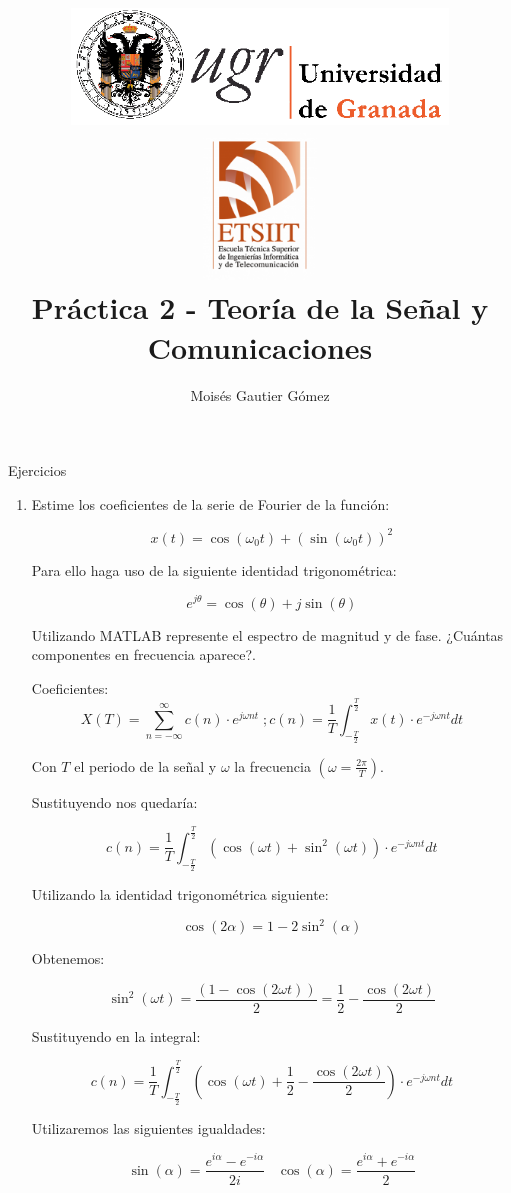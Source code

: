 \documentclass[a4paper,12pt]{article}
\author{Moisés Gautier Gómez}
\title{\includegraphics[width=10cm]{logo_ugr.png} \\ \includegraphics[width=3cm]{fetch.png}\\ Práctica 2 - Teoría de la Señal y Comunicaciones 
}
\date{ }
\begin{document}
\maketitle
Ejercicios
%

\begin{enumerate}
\item Estime los coeficientes de la serie de Fourier de la función:

  $$x(t) = \cos(\omega_{0}t) + (\sin(\omega_{0}t))^2$$

  Para ello haga uso de la siguiente identidad trigonométrica:

  $$e^{j\theta} = \cos(\theta) + j \sin(\theta)$$

  Utilizando MATLAB represente el espectro de magnitud y de fase. ¿Cuántas componentes en frecuencia aparece?.

  Coeficientes:
  $$X(T) = \sum_{n = -\infty}^{\infty} c(n) \cdot e^{j \omega n t}\; ; c(n) = \frac{1}{T} \int_{-\frac{T}{2}}^{\frac{T}{2}} x(t) \cdot e^{-j \omega n t} dt $$

  Con $T$ el periodo de la señal y $\omega$ la frecuencia $(\omega = \frac{2\pi}{T})$.

  Sustituyendo nos quedaría:

  $$c(n) = \frac{1}{T} \int_{-\frac{T}{2}}^{\frac{T}{2}} (\cos(\omega t) + \sin^{2} (\omega t)) \cdot e^{-j \omega n t} dt$$

  Utilizando la identidad trigonométrica siguiente: 
  
  $$ \cos(2\alpha) = 1 - 2\sin^{2}(\alpha)$$

  Obtenemos:
 
  $$ \sin^{2} (\omega t) = \frac{(1 - \cos(2 \omega t))}{2} = \frac{1}{2} - \frac{\cos(2 \omega t)}{2} $$

  Sustituyendo en la integral:

  $$ c(n) = \frac{1}{T} \int_{-\frac{T}{2}}^{\frac{T}{2}} (\cos(\omega t) + \frac{1}{2} - \frac{\cos(2 \omega t)}{2}) \cdot e^{-j \omega n t} dt $$

  Utilizaremos las siguientes igualdades:

  $$ \sin(\alpha) = \frac{e^{i \alpha} - e^{-i \alpha}}{2i} \; \; \; \cos(\alpha) = \frac{e^{i \alpha} + e^{-i \alpha}}{2} $$


\end{enumerate}
\end{document}
